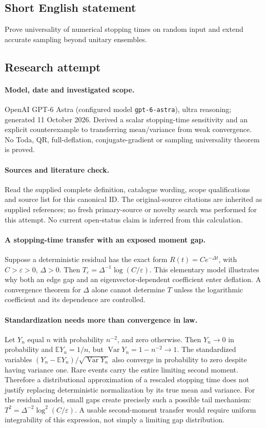 \documentclass[11pt]{article}
\begin{document}
\subsection{Short English statement}
Prove universality of numerical stopping times on random input and extend accurate sampling beyond unitary ensembles.
\subsection{Research attempt}
\paragraph{Model, date and investigated scope.}
OpenAI GPT-6 Astra (configured model \texttt{gpt-6-astra}), ultra reasoning; generated 11 October 2026. Derived a scalar stopping-time sensitivity and an explicit counterexample to transferring mean/variance from weak convergence. No Toda, QR, full-deflation, conjugate-gradient or sampling universality theorem is proved.

\paragraph{Sources and literature check.}
Read the supplied complete definition, catalogue wording, scope qualifications and source list for this canonical ID. The original-source citations are inherited as supplied references; no fresh primary-source or novelty search was performed for this attempt. No current open-status claim is inferred from this calculation.

\paragraph{A stopping-time transfer with an exposed moment gap.}Suppose a deterministic residual has the exact form \(R(t)=Ce^{-\Delta t}\), with \(C>\varepsilon>0\), \(\Delta>0\). Then \(T_\varepsilon=\Delta^{-1}\log(C/\varepsilon)\). This elementary model illustrates why both an edge gap and an eigenvector-dependent coefficient enter deflation. A convergence theorem for \(\Delta\) alone cannot determine \(T\) unless the logarithmic coefficient and its dependence are controlled.
\paragraph{Standardization needs more than convergence in law.}Let \(Y_n\) equal \(n\) with probability \(n^{-2}\), and zero otherwise. Then \(Y_n\to0\) in probability and \(\mathbb EY_n=1/n\), but \(\operatorname{Var}Y_n=1-n^{-2}\to1\). The standardized variables \((Y_n-\mathbb EY_n)/\sqrt{\operatorname{Var}Y_n}\) also converge in probability to zero despite having variance one. Rare events carry the entire limiting second moment. Therefore a distributional approximation of a rescaled stopping time does not justify replacing deterministic normalization by its true mean and variance.
For the residual model, small gaps create precisely such a possible tail mechanism: \(T^2=\Delta^{-2}\log^2(C/\varepsilon)\). A usable second-moment transfer would require uniform integrability of this expression, not simply a limiting gap distribution.
\end{document}

